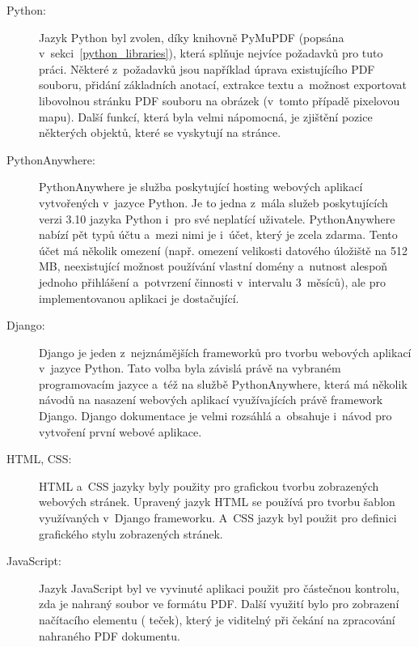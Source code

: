 \begin{description}
    \item[Python:] Jazyk Python byl zvolen, díky knihovně PyMuPDF
    (popsána v~sekci~\ref{python_libraries}), která splňuje nejvíce požadavků
    pro tuto práci. Některé z~požadavků jsou například úprava existujícího PDF
    souboru, přidání základních anotací, extrakce textu a~možnost exportovat
    libovolnou stránku PDF souboru na obrázek (v~tomto případě pixelovou mapu).
    Další funkcí, která byla velmi nápomocná, je zjištění pozice některých
    objektů, které se vyskytují na stránce.

    \item[PythonAnywhere:] PythonAnywhere je služba poskytující hosting webových
    aplikací vytvořených v~jazyce Python. Je to jedna z~mála služeb poskytujících
    verzi 3.10 jazyka Python i~pro své neplatící uživatele. PythonAnywhere
    nabízí pět typů účtu a~mezi nimi je i~účet, který je zcela zdarma. Tento
    účet má několik omezení (např. omezení velikosti datového úložiště na
    512\,MB, neexistující možnost používání vlastní domény a~nutnost alespoň jednoho
    přihlášení a~potvrzení činnosti v~intervalu 3~měsíců), ale pro
    implementovanou aplikaci je dostačující.

    \item[Django:] Django je jeden z~nejznámějších frameworků pro tvorbu webových
    aplikací v~jazyce Python. Tato volba byla závislá právě na vybraném
    programovacím jazyce a~též na službě PythonAnywhere, která má několik
    návodů na nasazení webových aplikací využívajících právě framework Django.
    Django dokumentace je velmi rozsáhlá a~obsahuje i~návod pro vytvoření
    první webové aplikace.
    
    \item[HTML, CSS:] HTML a~CSS jazyky byly použity pro grafickou tvorbu
    zobrazených webových stránek. Upravený jazyk HTML se používá pro tvorbu
    šablon využívaných v~Django frameworku. A~CSS jazyk byl použit pro
    definici grafického stylu zobrazených stránek.
    
    \item[JavaScript:] Jazyk JavaScript byl ve vyvinuté aplikaci použit pro
    částečnou kontrolu, zda je nahraný soubor ve formátu PDF. Další využití
    bylo pro zobrazení načítacího elementu ( teček),
    který je viditelný při čekání na zpracování nahraného PDF dokumentu.
    
\end{description}



